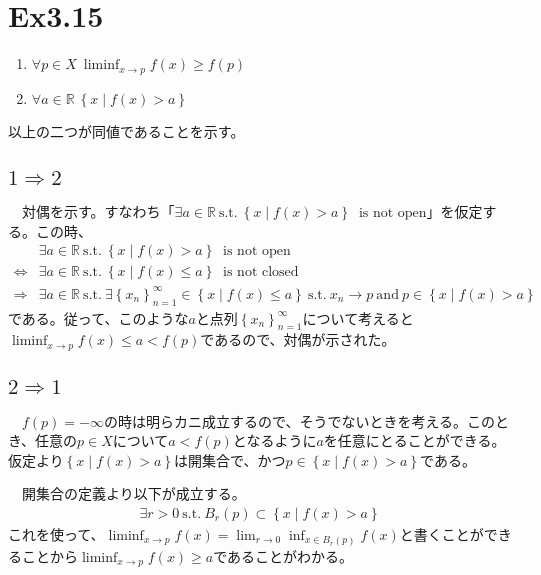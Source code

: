 \documentclass{article}
\begin{document}
\section{Ex3.15}
\begin{enumerate}
	\item $\forall p \in X\ \liminf_{x\to p} f(x) \geq f(p)$ 
	\item $\forall a\in \mathbb{R}\ \left\{ x\mid f(x) >a\right\}$
\end{enumerate}
以上の二つが同値であることを示す。

\subsection{$1\Rightarrow 2$}
　対偶を示す。すなわち「$\exists a\in \mathbb{R}\ \text{s.t.}\ \left\{ x\mid f(x) > a \right\}\ \text{\ is not open}$」を仮定する。この時、
\begin{align*}
&\exists a\in \mathbb{R}\ \text{s.t.}\ \left\{ x\mid f(x) > a \right\}\ \text{\ is not open}\\
\Leftrightarrow
&\exists a\in \mathbb{R}\ \text{s.t.}\ \left\{ x\mid f(x) \leq a \right\}\ \text{\ is not closed}\\
\Rightarrow
&\exists a\in \mathbb{R}\ \text{s.t.}\  \exists \left\{ x_n \right\}_{n=1}^{\infty} \in \left\{x\mid f(x) \leq a \right\}\ \text{s.t.}\ x_n \to p\ \text{and}\ p\in \left\{x\mid f(x) > a \right\}
\end{align*}
である。従って、このような$a$と点列$\left\{ x_n \right\}_{n=1}^{\infty}$について考えると$\liminf_{x\to p} f(x) \leq a < f(p)$であるので、対偶が示された。


\subsection{$2\Rightarrow 1$}
　$f(p) = -\infty$の時は明らカニ成立するので、そうでないときを考える。このとき、任意の$p\in X$について$a < f(p)$となるように$a$を任意にとることができる。仮定より$\left\{ x\mid f(x) > a \right\}$は開集合で、かつ$p \in \left\{ x\mid f(x) > a \right\}$である。

　開集合の定義より以下が成立する。
\begin{align*}
	\exists r>0\ \text{s.t.}\ B_{r}(p) \subset \left\{ x\mid f(x) > a \right\}
\end{align*}
これを使って、$\liminf_{x\to p} f(x) = \lim_{r\to 0} \inf_{x\in B_{r}(p)} f(x)$と書くことができることから$\liminf_{x\to p} f(x) \geq a$であることがわかる。
\end{document}
